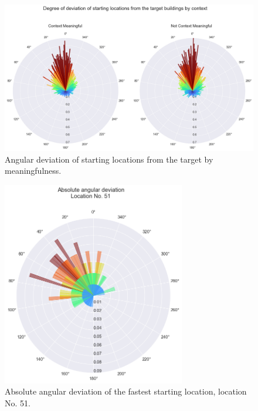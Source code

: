 \begin{figure}[!htb]
	\centering
	\includegraphics[width=140mm]{figures/by_context_deviation_for_starting_locations_23.png}
	\caption[Angular deviation of starting locations from the target by meaningfulness]{Angular deviation of starting locations from the target by meaningfulness.}
	\label{fig:by_context_deviation_for_starting_locations_23}
\end{figure}

\begin{figure}[!htb]
	\centering
	\includegraphics[width=80mm]{figures/deviation_degrees_loc_nr_51_23.png}
	\caption[Absolute angular deviation of the fastest starting location]{Absolute angular deviation of the fastest starting location, location No. 51.}
	\label{fig:angle_fastest_loc}
\end{figure}

